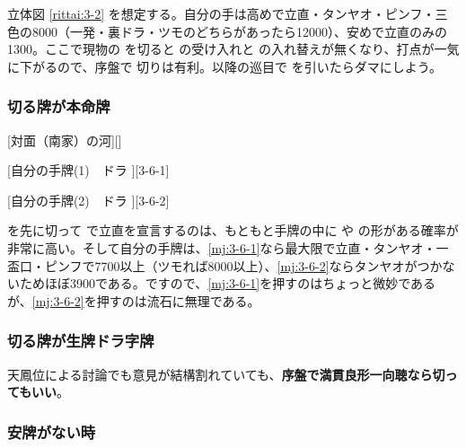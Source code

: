 \documentclass[10pt, twocolumn]{article}
\begin{document}
\begin{rittai}[h]
  \centering
  
  
  \caption{序盤で手牌の価値の範囲が大きい場合}
  \label{rittai:3-2}
\end{rittai}

立体図 \ref{rittai:3-2} を想定する。自分の手は高めで立直・タンヤオ・ピンフ・三色の8000（一発・裏ドラ・ツモのどちらがあったら12000）、安めで立直のみの1300。ここで現物の  を切ると  の受け入れと  の入れ替えが無くなり、打点が一気に下がるので、序盤で  切りは有利。以降の巡目で  を引いたらダマにしよう\citep[][pp. 62--65]{tetsuoshi}。

\subsubsection*{切る牌が本命牌}

[対面（南家）の河][]

[自分の手牌(1)　ドラ ][3-6-1]

[自分の手牌(2)　ドラ ][3-6-2]

 を先に切って  で立直を宣言するのは、もともと手牌の中に  や  の形がある確率が非常に高い。そして自分の手牌は、\ref{mj:3-6-1}なら最大限で立直・タンヤオ・一盃口・ピンフで7700以上（ツモれば8000以上）、\ref{mj:3-6-2}ならタンヤオがつかないためほぼ3900である。ですので、\ref{mj:3-6-1}を押すのはちょっと微妙であるが、\ref{mj:3-6-2}を押すのは流石に無理である\citep[][pp.~66--73]{tetsuoshi}。

\subsubsection*{切る牌が生牌ドラ字牌}

天鳳位による討論でも意見が結構割れていても、\textbf{序盤で満貫良形一向聴なら切ってもいい}\citep[][pp.~114--115]{tetsuoshi}。

\subsubsection*{安牌がない時}
\end{document}
